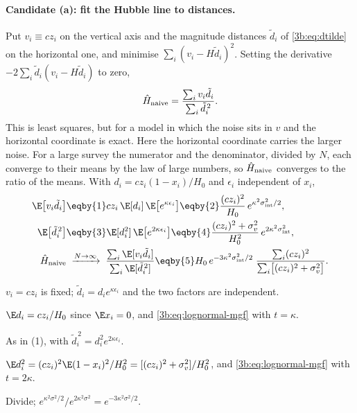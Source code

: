 \paragraph{Candidate (a): fit the Hubble line to distances.}
Put $v_i\equiv cz_i$ on the vertical axis and the magnitude distances
$\tilde d_i$ of \eqref{3b:eq:dtilde} on the horizontal one, and minimise
$\sum_i(v_i-H\tilde d_i)^2$. Setting the derivative
$-2\sum_i\tilde d_i(v_i-H\tilde d_i)$ to zero,
\begin{equation}
  \hat H_{\rm naive}=\frac{\sum_iv_i\tilde d_i}{\sum_i\tilde d_i^{\,2}} .
  \label{3b:eq:h-naive}
\end{equation}
This is least squares, but for a model in which the noise sits in $v$ and the
horizontal coordinate is exact. Here the horizontal coordinate carries the
larger noise. For a large survey the numerator and the denominator, divided
by $N$, each converge to their means by the law of large numbers, so
$\hat H_{\rm naive}$ converges to the ratio of the means. With
$d_i=cz_i(1-x_i)/H_0$ and $\epsilon_i$ independent of $x_i$,
\begin{align}
  \E\bigl[v_i\tilde d_i\bigr]
  &\eqby{1}cz_i\,\E[d_i]\,\E\bigl[e^{\kappa\epsilon_i}\bigr]
   \eqby{2}\frac{(cz_i)^2}{H_0}\,e^{\kappa^2\sigma_{\rm int}^2/2},\nonumber\\
  \E\bigl[\tilde d_i^{\,2}\bigr]
  &\eqby{3}\E[d_i^2]\,\E\bigl[e^{2\kappa\epsilon_i}\bigr]
   \eqby{4}\frac{(cz_i)^2+\sigma_v^2}{H_0^2}\,e^{2\kappa^2\sigma_{\rm int}^2},\nonumber\\
  \hat H_{\rm naive}
  &\;\xrightarrow{N\to\infty}\;
   \frac{\sum_i\E[v_i\tilde d_i]}{\sum_i\E[\tilde d_i^{\,2}]}
   \eqby{5}H_0\,e^{-3\kappa^2\sigma_{\rm int}^2/2}\;
   \frac{\sum_i(cz_i)^2}{\sum_i\bigl[(cz_i)^2+\sigma_v^2\bigr]} .
  \label{3b:eq:naive-bias}
\end{align}
\begin{explain}
  \item $v_i=cz_i$ is fixed; $\tilde d_i=d_ie^{\kappa\epsilon_i}$ and the two
        factors are independent.
  \item $\E d_i=cz_i/H_0$ since $\E x_i=0$, and \eqref{3b:eq:lognormal-mgf}
        with $t=\kappa$.
  \item As in (1), with $\tilde d_i^{\,2}=d_i^2e^{2\kappa\epsilon_i}$.
  \item $\E d_i^2=(cz_i)^2\E(1-x_i)^2/H_0^2=[(cz_i)^2+\sigma_v^2]/H_0^2$,
        and \eqref{3b:eq:lognormal-mgf} with $t=2\kappa$.
  \item Divide; $e^{\kappa^2\sigma^2/2}/e^{2\kappa^2\sigma^2}=e^{-3\kappa^2\sigma^2/2}$.
\end{explain}
